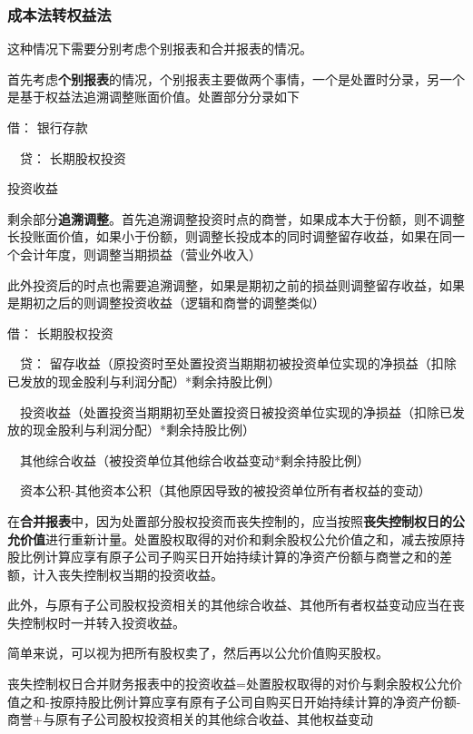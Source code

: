 \documentclass[UTF8,12pt]{ctexart}
\newenvironment{Dr}{\noindent 借：}{\par}
\newenvironment{Cr}{\noindent \ \ 贷：}{\par}
\numberwithin{equation}{section} %
\numberwithin{figure}{section}
\numberwithin{table}{section}
\begin{document}
	
	\subsubsection{成本法转权益法}
	这种情况下需要分别考虑个别报表和合并报表的情况。
	
	首先考虑\textbf{个别报表}的情况，个别报表主要做两个事情，一个是处置时分录，另一个是基于权益法追溯调整账面价值。处置部分分录如下
	
	\begin{Dr}
		银行存款
	\end{Dr}
	\begin{Cr}
		长期股权投资
		
		投资收益
	\end{Cr}
	
	剩余部分\textbf{追溯调整}。首先追溯调整投资时点的商誉，如果成本大于份额，则不调整长投账面价值，如果小于份额，则调整长投成本的同时调整留存收益，如果在同一个会计年度，则调整当期损益（营业外收入）
	
	此外投资后的时点也需要追溯调整，如果是期初之前的损益则调整留存收益，如果是期初之后的则调整投资收益（逻辑和商誉的调整类似）
	
	\begin{Dr}
		长期股权投资
	\end{Dr}
	\begin{Cr}
		留存收益（原投资时至处置投资当期期初被投资单位实现的净损益（扣除已发放的现金股利与利润分配）*剩余持股比例）
		
		\ \ 投资收益（处置投资当期期初至处置投资日被投资单位实现的净损益（扣除已发放的现金股利与利润分配）*剩余持股比例）
		
		\ \ 其他综合收益（被投资单位其他综合收益变动*剩余持股比例）
		
		\ \ 资本公积-其他资本公积（其他原因导致的被投资单位所有者权益的变动）
	\end{Cr}
	
	在\textbf{合并报表}中，因为处置部分股权投资而丧失控制的，应当按照\textbf{丧失控制权日的公允价值}进行重新计量。处置股权取得的对价和剩余股权公允价值之和，减去按原持股比例计算应享有原子公司子购买日开始持续计算的净资产份额与商誉之和的差额，计入丧失控制权当期的投资收益。
	
	此外，与原有子公司股权投资相关的其他综合收益、其他所有者权益变动应当在丧失控制权时一并转入投资收益。
	
	简单来说，可以视为把所有股权卖了，然后再以公允价值购买股权。
	
	丧失控制权日合并财务报表中的投资收益=处置股权取得的对价与剩余股权公允价值之和-按原持股比例计算应享有原有子公司自购买日开始持续计算的净资产份额-商誉+与原有子公司股权投资相关的其他综合收益、其他权益变动
	
\end{document}
